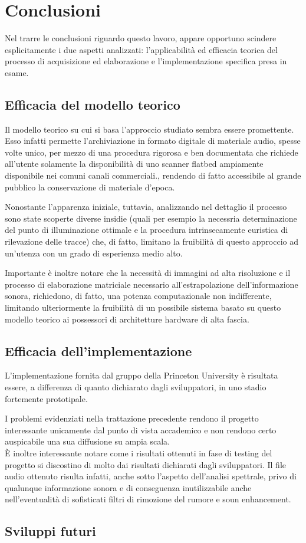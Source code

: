 \section{Conclusioni}
Nel trarre le conclusioni riguardo questo lavoro, appare opportuno scindere esplicitamente i due aspetti analizzati: l'applicabilit\`a ed efficacia teorica del processo di acquisizione ed elaborazione e l'implementazione specifica presa in esame.
\subsection{Efficacia del modello teorico}
Il modello teorico su cui si basa l'approccio studiato sembra essere promettente. Esso infatti permette l'archiviazione in formato digitale di materiale audio, spesse volte unico, per mezzo di una procedura rigorosa e ben documentata che richiede all'utente solamente la disponibilit\`a di uno scanner flatbed ampiamente disponibile nei comuni canali commerciali., rendendo di fatto accessibile al grande pubblico la conservazione di materiale d'epoca.

Nonostante l'apparenza iniziale, tuttavia, analizzando nel dettaglio il processo sono state scoperte diverse insidie (quali per esempio la necessria determinazione del punto di illuminazione ottimale e la procedura intrinsecamente euristica di rilevazione delle tracce) che, di fatto, limitano la fruibilit\`a di questo approccio ad un'utenza con un grado di esperienza medio alto. 

Importante \`e inoltre notare che la necessit\`a di immagini ad alta risoluzione e il processo di elaborazione matriciale necessario all'estrapolazione dell'informazione sonora, richiedono, di fatto, una potenza computazionale non indifferente, limitando ulteriormente la fruibilit\`a di un possibile sistema basato su questo modello teorico ai possessori di architetture hardware di alta fascia.

\subsection{Efficacia dell'implementazione}
L'implementazione fornita dal gruppo della Princeton University \`e risultata essere, a differenza di quanto dichiarato dagli sviluppatori, in uno stadio fortemente prototipale.

I problemi evidenziati nella trattazione precedente rendono il progetto interessante unicamente dal punto di vista accademico e non rendono certo auspicabile una sua diffusione su ampia scala.\\
\`E inoltre interessante notare come i risultati ottenuti in fase di testing del progetto si discostino di molto dai risultati dichiarati dagli sviluppatori. Il file audio ottenuto risulta infatti, anche sotto l'aspetto dell'analisi spettrale, privo di qualunque informazione sonora e di conseguenza inutilizzabile anche nell'eventualit\`a di sofisticati filtri di rimozione del rumore e soun enhancement.

\subsection{Sviluppi futuri}